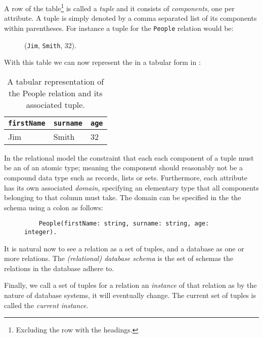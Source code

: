 A row of the table\footnote{Excluding the row with the headings.} is called a \emph{tuple} and it consists of \emph{components}, one per attribute. A tuple is simply denoted by a comma separated list of its components within parentheses. For instance a tuple for the \verb|People| relation would be:
\begin{figure}[!h]
  \centering
  (\verb|Jim|, \verb|Smith|, 32).
\end{figure}

With this table we can now represent the  in a tabular form in :
\begin{table}[h]
  \centering
  \begin{tabular}{l|l|l}
    \verb|firstName| & \verb|surname| & \verb|age| \\
    \hline\hline
    Jim & Smith & 32\\
  \end{tabular}
  \caption[People relation with tuple]{A tabular representation of the People relation and its associated tuple.}
  \label{tab:peopleRelationWithTuple}
\end{table}

In the relational model the constraint that each each component of a tuple must be an of an atomic type; meaning the component should reasonably not be a compound data type such as records, lists or sets. Furthermore, each attribute has its own associated \emph{domain}, specifying an elementary type that all components belonging to that column must take. The domain can be specified in the the schema using a colon as follows:
\begin{figure}[!h]
  \begin{verbatim}
    People(firstName: string, surname: string, age: integer).
  \end{verbatim}
\end{figure}

It is natural now to see a relation as a set of tuples, and a database as one or more relations. The \emph{(relational) database schema} is the set of schemas the relations in the database adhere to.\cite{DatabaseSystems}

Finally, we call a set of tuples for a relation an \emph{instance} of that relation as by the nature of database systems, it will eventually change. The current set of tuples is called the \emph{current instance}.\cite{DatabaseSystems}

